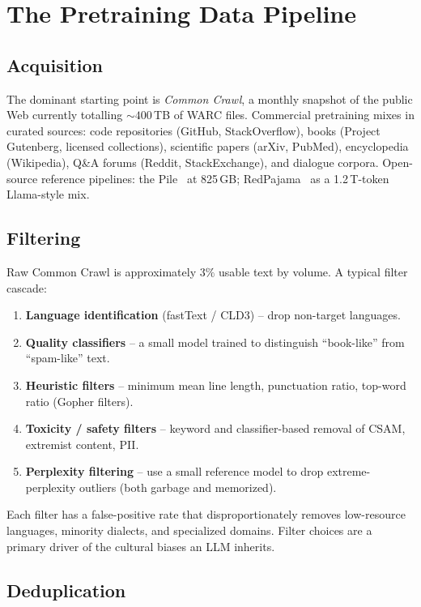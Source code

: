 \section{The Pretraining Data Pipeline}

\subsection{Acquisition}

The dominant starting point is \emph{Common Crawl}, a monthly
snapshot of the public Web currently totalling $\sim\!400$\,TB of
WARC files. Commercial pretraining mixes in curated sources: code
repositories (GitHub, StackOverflow), books (Project Gutenberg,
licensed collections), scientific papers (arXiv, PubMed),
encyclopedia (Wikipedia), Q\&A forums (Reddit, StackExchange), and
dialogue corpora. Open-source reference pipelines: the
Pile~\citep{gao2020pile} at 825\,GB; RedPajama~\citep{redpajama2023} as
a 1.2\,T-token Llama-style mix.

\subsection{Filtering}

Raw Common Crawl is approximately $3\%$ usable text by volume. A
typical filter cascade:
\begin{enumerate}
  \item \textbf{Language identification} (fastText / CLD3) -- drop
        non-target languages.
  \item \textbf{Quality classifiers} -- a small model trained to
        distinguish ``book-like'' from ``spam-like'' text.
  \item \textbf{Heuristic filters} -- minimum mean line length,
        punctuation ratio, top-word ratio (Gopher filters).
  \item \textbf{Toxicity / safety filters} -- keyword and
        classifier-based removal of CSAM, extremist content, PII.
  \item \textbf{Perplexity filtering} -- use a small reference model
        to drop extreme-perplexity outliers (both garbage and
        memorized).
\end{enumerate}
Each filter has a false-positive rate that disproportionately removes
low-resource languages, minority dialects, and specialized domains.
Filter choices are a primary driver of the cultural biases an LLM
inherits.

\subsection{Deduplication}

